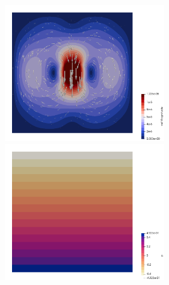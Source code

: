 \begin{center}
\includegraphics[width=7cm]{python_codes/fieldstone_76/results/block/vel}
\includegraphics[width=7cm]{python_codes/fieldstone_76/results/block/press}
\end{center}


